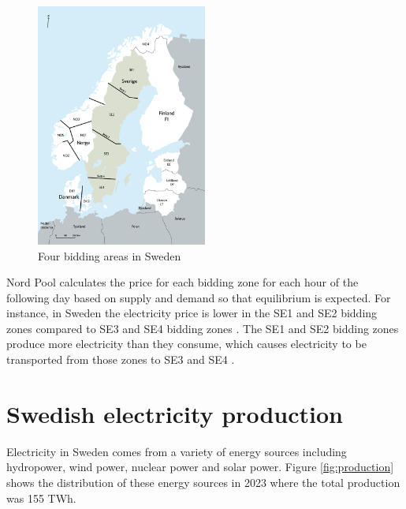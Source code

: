 \begin{figure}[H]
    \centering
    \includegraphics[width=0.5\textwidth]{figures/elomraden.png}
    \caption{Four bidding areas in Sweden}
    \label{fig:zones}
\end{figure}

\noindent
Nord Pool calculates the price for each bidding zone for each hour of the following day based on supply and demand \cite{NordPool} so that equilibrium is expected. For instance, in Sweden the electricity price is lower in the SE1 and SE2 bidding zones compared to SE3 and SE4 bidding zones \cite{areas}. The SE1 and SE2 bidding zones produce more electricity than they consume, which causes electricity to be transported from those zones to SE3 and SE4 \cite{areas}. 

\section{Swedish electricity production}
Electricity in Sweden comes from a variety of energy sources including hydropower, wind power, nuclear power and solar power. Figure \ref{fig:production} shows the distribution of these energy sources in 2023 where the total production was 155 TWh. 

